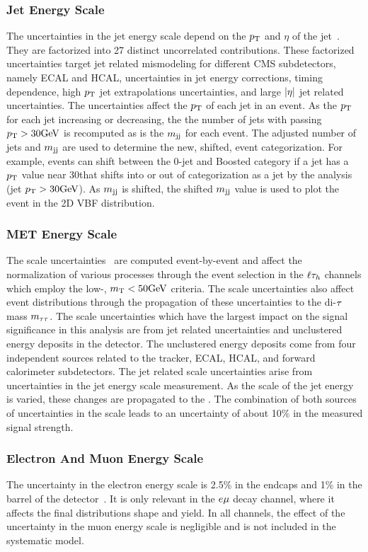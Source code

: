 \subsubsection{Jet Energy Scale}
The uncertainties in the jet energy scale depend on the $p_\mathrm{T}$ and $\eta$ of the jet~\cite{CMS-JME-10-011}.
They are factorized into 27 distinct uncorrelated contributions. These factorized uncertainties target jet related 
mismodeling for different CMS subdetectors, namely ECAL and HCAL, uncertainties in jet energy corrections, timing dependence,
high $p_\mathrm{T}$ jet extrapolations uncertainties, and large $\lvert\eta\rvert$ jet related uncertainties. The uncertainties
affect the $p_\mathrm{T}$ of each jet in an event. As the $p_\mathrm{T}$ for each jet increasing or decreasing, the 
the number of jets with passing $p_\mathrm{T} > 30\mathrm{GeV}$ is recomputed as is the $m_\mathrm{jj}$ for each event. The adjusted number of
jets and $m_\mathrm{jj}$ are used to determine the new, shifted, event categorization. For example,
events can shift between the 0-jet and Boosted category if a jet has a $p_\mathrm{T}$ value near 30\GeV that shifts into
or out of categorization as a jet by the analysis (jet $p_\mathrm{T} > 30\mathrm{GeV}$). As $m_\mathrm{jj}$ is shifted, the shifted $m_\mathrm{jj}$ value is used
to plot the event in the 2D VBF distribution.


\subsubsection{MET Energy Scale}
The \etvecmiss scale uncertainties~\cite{CMS-JME-12-002} are computed event-by-event and affect the normalization of 
various processes through the event selection in the $\ell\tau_{h}$ channels which employ the low-\MT,
$m_\mathrm{T} < 50\mathrm{GeV}$ criteria. The \etvecmiss scale uncertainties also affect event distributions through the 
propagation of these uncertainties 
to the di-$\tau$ mass $m_{\tau\tau}$. The \etvecmiss scale uncertainties which have the largest impact on the signal significance
in this analysis are from jet related uncertainties and unclustered energy deposits in the detector.
The unclustered energy deposits come from four independent sources related to the tracker, ECAL, HCAL, and 
forward calorimeter subdetectors. The jet related \etvecmiss scale uncertainties arise from uncertainties
in the jet energy scale measurement. As the scale of the jet energy is varied, these changes are propagated to
the \etvecmiss. The combination of both sources of uncertainties in 
the \etvecmiss scale leads to an uncertainty of about 10\% in the measured signal strength.


\subsubsection{Electron And Muon Energy Scale}
The uncertainty in the electron energy scale is 2.5\% in the endcaps and 1\% in the barrel of the 
detector~\cite{Chatrchyan:2014nva}. 
It is only relevant in the $e\mu$ decay channel, where it affects the final distributions shape and yield.
In all channels, the effect of the uncertainty in the muon energy scale is negligible and is not included
in the systematic model.


